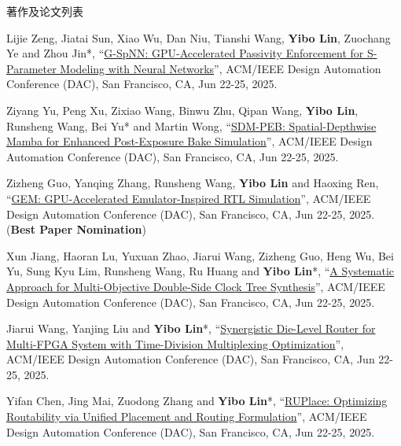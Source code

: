 \begin{rSection}{著作及论文列表}
\begin{description}[font=\normalfont, rightmargin=2em]
{}
            

\item[{[C189]}]{
        Lijie Zeng, Jiatai Sun, Xiao Wu, Dan Niu, Tianshi Wang, \textbf{Yibo Lin}, Zuochang Ye and Zhou Jin*, 
    ``\href{https://doi.org/10.1109/DAC63849.2025.11133072}{G-SpNN: GPU-Accelerated Passivity Enforcement for S-Parameter Modeling with Neural Networks}'', 
    ACM/IEEE Design Automation Conference (DAC), San Francisco, CA, Jun 22-25, 2025.
    
}
            

\item[{[C188]}]{
        Ziyang Yu, Peng Xu, Zixiao Wang, Binwu Zhu, Qipan Wang, \textbf{Yibo Lin}, Runsheng Wang, Bei Yu* and Martin Wong, 
    ``\href{https://doi.org/10.1109/DAC63849.2025.11133153}{SDM-PEB: Spatial-Depthwise Mamba for Enhanced Post-Exposure Bake Simulation}'', 
    ACM/IEEE Design Automation Conference (DAC), San Francisco, CA, Jun 22-25, 2025.
    
}
            

\item[{[C187]}]{
        Zizheng Guo, Yanqing Zhang, Runsheng Wang, \textbf{Yibo Lin} and Haoxing Ren, 
    ``\href{https://doi.org/10.1109/DAC63849.2025.11132713}{GEM: GPU-Accelerated Emulator-Inspired RTL Simulation}'', 
    ACM/IEEE Design Automation Conference (DAC), San Francisco, CA, Jun 22-25, 2025.
    (\textbf{Best Paper Nomination})
}
            

\item[{[C186]}]{
        Xun Jiang, Haoran Lu, Yuxuan Zhao, Jiarui Wang, Zizheng Guo, Heng Wu, Bei Yu, Sung Kyu Lim, Runsheng Wang, Ru Huang and \textbf{Yibo Lin}*, 
    ``\href{https://doi.org/10.1109/DAC63849.2025.11133160}{A Systematic Approach for Multi-Objective Double-Side Clock Tree Synthesis}'', 
    ACM/IEEE Design Automation Conference (DAC), San Francisco, CA, Jun 22-25, 2025.
    
}
            

\item[{[C185]}]{
        Jiarui Wang, Yanjing Liu and \textbf{Yibo Lin}*, 
    ``\href{https://doi.org/10.1109/DAC63849.2025.11132952}{Synergistic Die-Level Router for Multi-FPGA System with Time-Division Multiplexing Optimization}'', 
    ACM/IEEE Design Automation Conference (DAC), San Francisco, CA, Jun 22-25, 2025.
    
}
            

\item[{[C184]}]{
        Yifan Chen, Jing Mai, Zuodong Zhang and \textbf{Yibo Lin}*, 
    ``\href{https://doi.org/10.1109/DAC63849.2025.11132838}{RUPlace: Optimizing Routability via Unified Placement and Routing Formulation}'', 
    ACM/IEEE Design Automation Conference (DAC), San Francisco, CA, Jun 22-25, 2025.
    
}
\end{description}
\end{rSection}
